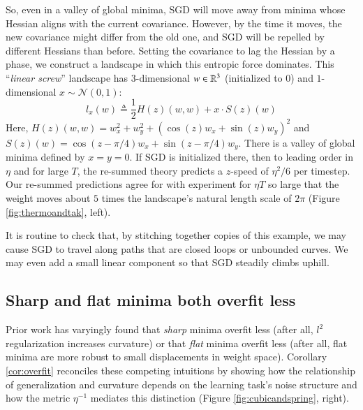 \documentclass{article}
\theoremstyle{plain}
\theoremstyle{definition}
\newcommand{\Nn}{\mathcal{N}}   \newcommand{\NN}{\mathbb{N}}
\begin{document}
        So, even in a valley of global minima,
        SGD will move away from minima whose Hessian aligns with the current
        covariance.  However, by the time it moves, the new covariance might
        differ from the old one, and SGD will be repelled by different Hessians
        than before.  Setting the covariance to lag the Hessian by a phase, we
        construct a landscape in which this entropic force dominates.  This
        ``\emph{linear screw}'' landscape has
        $3$-dimensional $w\in \mathbb{R}^3$ (initialized to $0$) and
        $1$-dimensional $x \sim \Nn(0, 1)$:
        $$
            l_x(w)
            \triangleq
            \frac{1}{2} H(z)(w, w) + x \cdot S(z)(w)  
        $$
        Here, $H(z)(w, w) = w_x^2 + w_y^2 + (\cos(z) w_x + \sin(z) w_y)^2$
        and   $S(z)(w)    = \cos(z-\pi/4) w_x + \sin(z-\pi/4) w_y$.
        There is a valley of global minima defined by $x=y=0$. 
        If SGD is initialized there, then to leading order in $\eta$ and for
        large $T$, the re-summed theory predicts a $z$-speed of $\eta^2/6$ 
        per timestep.  Our re-summed predictions agree for
        with experiment for $\eta T$ so large that the weight moves about $5$
        times the landscape's natural length scale of $2\pi$ (Figure
        \ref{fig:thermoandtak}, left).

        It is routine to check that, by stitching together copies of this
        example, we may cause SGD to travel along paths that are closed loops
        or unbounded curves.  We may even add a small linear component so
        that SGD steadily climbs uphill.  


    \subsection{Sharp and flat minima both overfit less} \label{subsect:overfit}

        Prior work has varyingly found that \emph{sharp} minima overfit less
        (after all, $l^2$ regularization increases curvature) or that
        \emph{flat} minima overfit less (after all, flat minima are more
        robust to small displacements in weight space).  Corollary
        \ref{cor:overfit} reconciles these competing intuitions by showing
        how the relationship of generalization and curvature depends on the
        learning task's noise structure and how the metric $\eta^{-1}$ mediates
        this distinction
        (Figure \ref{fig:cubicandspring}, right).
        
\end{document}
